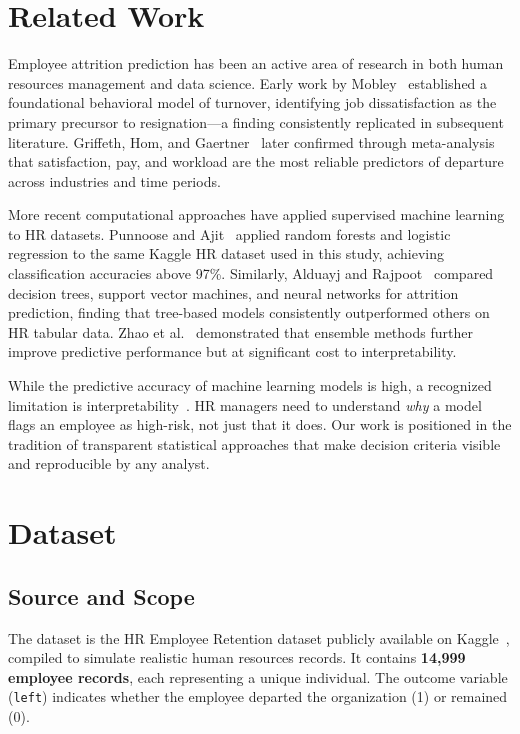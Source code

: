 \documentclass[conference]{IEEEtran}
\begin{document}
\section{Related Work}
\label{sec:related}

Employee attrition prediction has been an active area of research in both
human resources management and data science. Early work by Mobley~\cite{mobley1977}
established a foundational behavioral model of turnover, identifying job
dissatisfaction as the primary precursor to resignation---a finding
consistently replicated in subsequent literature. Griffeth, Hom, and
Gaertner~\cite{griffeth2000} later confirmed through meta-analysis that
satisfaction, pay, and workload are the most reliable predictors of departure
across industries and time periods.

More recent computational approaches have applied supervised machine learning
to HR datasets. Punnoose and Ajit~\cite{punnoose2016} applied random forests
and logistic regression to the same Kaggle HR dataset used in this study,
achieving classification accuracies above 97\%. Similarly, Alduayj and
Rajpoot~\cite{alduayj2018} compared decision trees, support vector machines,
and neural networks for attrition prediction, finding that tree-based models
consistently outperformed others on HR tabular data. Zhao et al.~\cite{zhao2018}
demonstrated that ensemble methods further improve predictive performance but
at significant cost to interpretability.

While the predictive accuracy of machine learning models is high, a
recognized limitation is interpretability~\cite{doshi2017}. HR managers need
to understand \textit{why} a model flags an employee as high-risk, not just
that it does. Our work is positioned in the tradition of transparent
statistical approaches that make decision criteria visible and reproducible
by any analyst.

\section{Dataset}
\label{sec:dataset}

\subsection{Source and Scope}

The dataset is the HR Employee Retention dataset publicly available on
Kaggle~\cite{kaggle}, compiled to simulate realistic human resources records.
It contains \textbf{14,999 employee records}, each representing a unique
individual. The outcome variable (\texttt{left}) indicates whether the
employee departed the organization (1) or remained (0).
\end{document}
